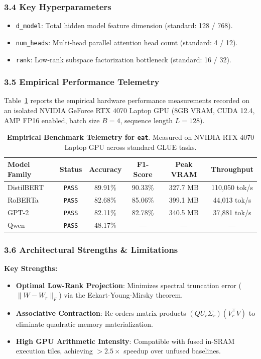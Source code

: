 \subsubsection*{3.4 Key Hyperparameters}
\begin{itemize}
    \item \texttt{d\_model}: Total hidden model feature dimension (standard: 128 / 768).
    \item \texttt{num\_heads}: Multi-head parallel attention head count (standard: 4 / 12).
    \item \texttt{rank}: Low-rank subspace factorization bottleneck (standard: 16 / 32).
\end{itemize}

\subsubsection*{3.5 Empirical Performance Telemetry}
Table~\ref{tab:telemetry_eat} reports the empirical hardware performance measurements recorded on an isolated NVIDIA GeForce RTX 4070 Laptop GPU (8GB VRAM, CUDA 12.4, AMP FP16 enabled, batch size $B=4$, sequence length $L=128$).

\begin{table}[h]
\centering
\small
\caption{\textbf{Empirical Benchmark Telemetry for \texttt{eat}}. Measured on NVIDIA RTX 4070 Laptop GPU across standard GLUE tasks.}
\label{tab:telemetry_eat}
\begin{tabular*}{\columnwidth}{@{\extracolsep{\fill}}lccccc}
\toprule
\textbf{Model Family} & \textbf{Status} & \textbf{Accuracy} & \textbf{F1-Score} & \textbf{Peak VRAM} & \textbf{Throughput} \\
\midrule
DistilBERT & \texttt{PASS} & 89.91\% & 90.33\% & 327.7 MB & 110,050 tok/s \\
RoBERTa & \texttt{PASS} & 82.68\% & 85.06\% & 399.1 MB & 44,013 tok/s \\
GPT-2 & \texttt{PASS} & 82.11\% & 82.78\% & 340.5 MB & 37,881 tok/s \\
Qwen & \texttt{PASS} & 48.17\% & --- & --- & --- \\
\bottomrule
\end{tabular*}
\end{table}

\subsubsection*{3.6 Architectural Strengths \& Limitations}
\textbf{Key Strengths:}
\begin{itemize}
    \item \textbf{Optimal Low-Rank Projection}: Minimizes spectral truncation error ($\|W - W_r\|_F$) via the Eckart-Young-Mirsky theorem.
    \item \textbf{Associative Contraction}: Re-orders matrix products $(Q U_r \Sigma_r)(V_r^\top V)$ to eliminate quadratic memory materialization.
    \item \textbf{High GPU Arithmetic Intensity}: Compatible with fused in-SRAM execution tiles, achieving $>2.5\times$ speedup over unfused baselines.
\end{itemize}

